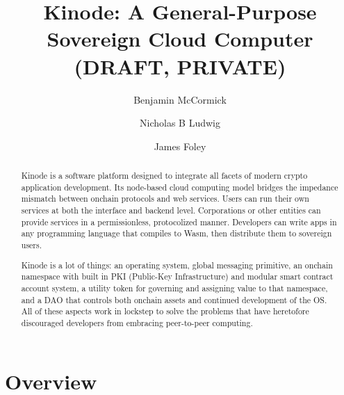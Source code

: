 \documentclass[runningheads]{llncs}
\begin{document}
%
\title{Kinode: A General-Purpose Sovereign Cloud Computer (DRAFT, PRIVATE)}
%
%
\author{
Benjamin McCormick \and
Nicholas B Ludwig \and
James Foley
}
%
%
\institute{ }
%
\maketitle              %
%
\begin{abstract}
Kinode is a software platform designed to integrate all facets of modern crypto application development.
Its node-based cloud computing model bridges the impedance mismatch between onchain protocols and web services.
Users can run their own services at both the interface and backend level.
Corporations or other entities can provide services in a permissionless, protocolized manner.
Developers can write apps in any programming language that compiles to Wasm, then distribute them to sovereign users. %

Kinode is a lot of things: an operating system, global messaging primitive,
an onchain namespace with built in PKI (Public-Key Infrastructure) and modular smart contract account system,
a utility token for governing and assigning value to that namespace,
and a DAO that controls both onchain assets and continued development of the OS.
All of these aspects work in lockstep to solve the problems that have heretofore discouraged developers from embracing peer-to-peer computing.

\end{abstract}
%
%
%
\tableofcontents
%
%
%
\section{Overview}
\label{sec:overview}
\end{document}
